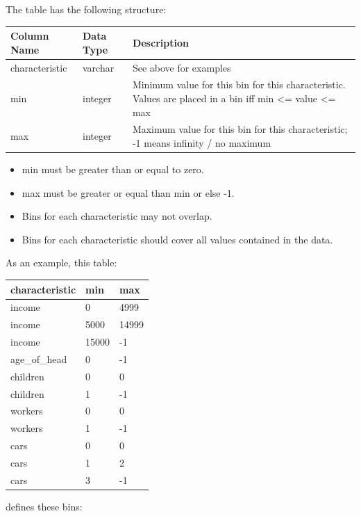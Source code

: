 The table has the following structure:


\begin{tabular}{llp{4.9in}}
\textbf{Column Name} & \textbf{Data Type} & \textbf{Description} \\
\hline
characteristic & varchar & See above for examples  \\
\hline
min & integer & Minimum value for this bin for this characteristic.
Values are placed in a bin iff min \textless{}= value \textless{}= max  \\
\hline
max & integer & Maximum value for this bin for this characteristic; -1 means infinity / no maximum  \\
\hline

\end{tabular}

\begin{itemize} \tight
\item min must be greater than or equal to zero.
\item max must be greater or equal than min or else -1.
\item Bins for each characteristic may not overlap.
\item Bins for each characteristic should cover all values contained in the data.
\end{itemize}

As an example, this table: 

\begin{tabular}{lll}
characteristic & min & max \\\hline
income &0 &4999 \\
income &5000 &14999 \\
income &15000 &-1 \\
age_of_head &0 &-1 \\
children &0 &0 \\
children &1 &-1 \\
workers &0 &0 \\
workers &1 &-1 \\
cars &0 &0 \\
cars &1 &2 \\
cars &3 &-1 \\

\end{tabular}

defines these bins:

